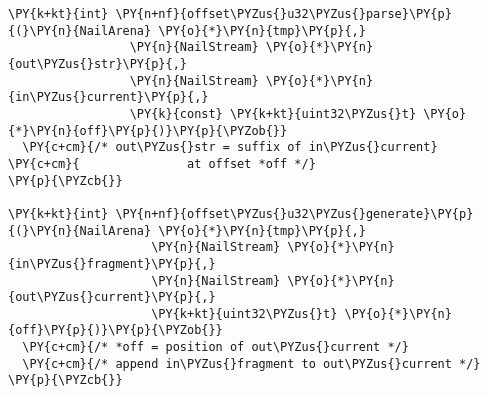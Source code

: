 \begin{Verbatim}[commandchars=\\\{\},codes={\catcode`\$=3\catcode`\^=7\catcode`\_=8}]
\PY{k+kt}{int} \PY{n+nf}{offset\PYZus{}u32\PYZus{}parse}\PY{p}{(}\PY{n}{NailArena} \PY{o}{*}\PY{n}{tmp}\PY{p}{,}
                 \PY{n}{NailStream} \PY{o}{*}\PY{n}{out\PYZus{}str}\PY{p}{,}
                 \PY{n}{NailStream} \PY{o}{*}\PY{n}{in\PYZus{}current}\PY{p}{,}
                 \PY{k}{const} \PY{k+kt}{uint32\PYZus{}t} \PY{o}{*}\PY{n}{off}\PY{p}{)}\PY{p}{\PYZob{}}
  \PY{c+cm}{/* out\PYZus{}str = suffix of in\PYZus{}current}
\PY{c+cm}{               at offset *off */}
\PY{p}{\PYZcb{}}

\PY{k+kt}{int} \PY{n+nf}{offset\PYZus{}u32\PYZus{}generate}\PY{p}{(}\PY{n}{NailArena} \PY{o}{*}\PY{n}{tmp}\PY{p}{,}
                    \PY{n}{NailStream} \PY{o}{*}\PY{n}{in\PYZus{}fragment}\PY{p}{,}
                    \PY{n}{NailStream} \PY{o}{*}\PY{n}{out\PYZus{}current}\PY{p}{,}
                    \PY{k+kt}{uint32\PYZus{}t} \PY{o}{*}\PY{n}{off}\PY{p}{)}\PY{p}{\PYZob{}}
  \PY{c+cm}{/* *off = position of out\PYZus{}current */}
  \PY{c+cm}{/* append in\PYZus{}fragment to out\PYZus{}current */}
\PY{p}{\PYZcb{}}
\end{Verbatim}
